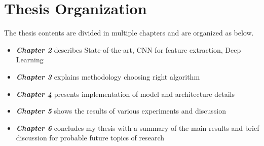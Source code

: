 \section{Thesis Organization }
The thesis contents are divided in multiple chapters and are organized as below.
\begin{itemize}
  \item {\textbf {\textit{Chapter 2}} describes State-of-the-art, CNN for feature extraction, Deep Learning}
  \item {\textbf {\textit{Chapter 3}} explains methodology choosing right algorithm}
	\item {\textbf {\textit{Chapter 4}} presents implementation of model and architecture details  }
	\item {\textbf {\textit{Chapter 5}} shows the results of various experiments and discussion  }
	\item {\textbf {\textit{Chapter 6}} concludes my thesis with a summary of the main results and brief discussion for probable future topics of research}
\end{itemize}
